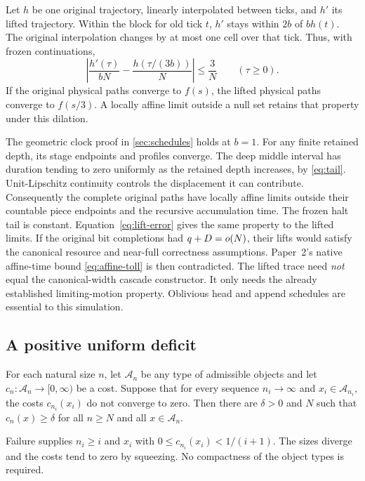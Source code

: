 Let $h$ be one original trajectory, linearly interpolated between ticks,
and $h'$ its lifted trajectory. Within the block for old tick $t$,
$h'$ stays within $2b$ of $bh(t)$. The original interpolation changes
by at most one cell over that tick. Thus, with frozen continuations,
\begin{equation}
\label{eq:lift-error}
 \left|\frac{h'(\tau)}{bN}
        -\frac{h(\tau/(3b))}{N}\right|\le\frac3N
 \qquad(\tau\ge0).
\end{equation}
If the original physical paths converge to $f(s)$, the lifted physical
paths converge to $f(s/3)$. A locally affine limit outside a null set
retains that property under this dilation.

The geometric clock proof in \cref{sec:schedules} holds at $b=1$.
For any finite retained depth, its stage endpoints and profiles converge.
The deep middle interval has duration tending to zero uniformly as the
retained depth increases, by \eqref{eq:tail}. Unit-Lipschitz continuity
controls the displacement it can contribute. Consequently the complete
original paths have locally affine limits outside their countable piece
endpoints and the recursive accumulation time. The frozen halt tail is
constant. Equation~\eqref{eq:lift-error} gives the same property to the
lifted limits.
If the original bit completions had $q+D=o(N)$, their lifts
would satisfy the canonical resource and near-full correctness
assumptions. Paper~2's native affine-time bound
\eqref{eq:affine-toll} is then contradicted. The lifted trace need
\emph{not} equal the canonical-width cascade constructor. It only needs
the already established limiting-motion property. Oblivious head and
append schedules are essential to this simulation.

\subsection{A positive uniform deficit}

\begin{lemma}
\label{lem:uniform-gap}
For each natural size $n$, let $\mathcal A_n$ be any type of admissible
objects and let $c_n:\mathcal A_n\to[0,\infty)$ be a cost. Suppose that
for every sequence $n_i\to\infty$ and $x_i\in\mathcal A_{n_i}$, the costs
$c_{n_i}(x_i)$ do not converge to zero. Then there are $\delta>0$ and $N$
such that $c_n(x)\ge\delta$ for all $n\ge N$ and all $x\in\mathcal A_n$.
\end{lemma}
\begin{outline}
Failure supplies $n_i\ge i$ and $x_i$ with
$0\le c_{n_i}(x_i)<1/(i+1)$. The sizes diverge and the costs tend to zero
by squeezing. No compactness of the object types is required.
\end{outline}

